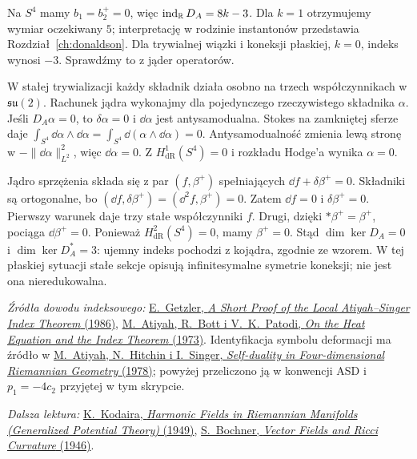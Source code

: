 \begin{przyklad}
\label{prz:hodge-asd-sfera-18}
Na $S^4$ mamy $b_1=b_2^+=0$, więc
$\operatorname{ind}_{\mathbb{R}} D_A=8k-3$.
Dla $k=1$ otrzymujemy wymiar oczekiwany $5$;
interpretację w rodzinie instantonów przedstawia
Rozdział~\ref{ch:donaldson}.
Dla trywialnej wiązki i koneksji płaskiej, $k=0$,
indeks wynosi $-3$. Sprawdźmy to z jąder operatorów.

W stałej trywializacji każdy składnik działa osobno na
trzech współczynnikach w $\mathfrak{su}(2)$.
Rachunek jądra wykonajmy dla pojedynczego rzeczywistego
składnika $\alpha$.
Jeśli $D_A\alpha=0$, to $\delta\alpha=0$ i
$\dd\alpha$ jest antysamodualna.
Stokes na zamkniętej sferze daje
$\int_{S^4}\dd\alpha\wedge\dd\alpha
=\int_{S^4}\dd(\alpha\wedge\dd\alpha)=0$.
Antysamodualność zmienia lewą stronę w
$-\|\dd\alpha\|_{L^2}^2$, więc $\dd\alpha=0$.
Z $H^1_{\mathrm{dR}}(S^4)=0$ i rozkładu Hodge'a wynika $\alpha=0$.

Jądro sprzężenia składa się z par $(f,\beta^+)$
spełniających $\dd f+\delta\beta^+=0$.
Składniki są ortogonalne, bo
$(\dd f,\delta\beta^+)=(\dd^2f,\beta^+)=0$.
Zatem $\dd f=0$ i $\delta\beta^+=0$.
Pierwszy warunek daje trzy stałe współczynniki $f$.
Drugi, dzięki $*\beta^+=\beta^+$, pociąga $\dd\beta^+=0$.
Ponieważ $H^2_{\mathrm{dR}}(S^4)=0$, mamy $\beta^+=0$.
Stąd $\dim\ker D_A=0$ i $\dim\ker D_A^*=3$:
ujemny indeks pochodzi z kojądra, zgodnie ze wzorem.
W tej płaskiej sytuacji stałe sekcje opisują
infinitesymalne symetrie koneksji; nie jest ona nieredukowalna.
\end{przyklad}

\par\smallskip
{\footnotesize\noindent\emph{Źródła dowodu indeksowego:}
\href{https://www.maths.ed.ac.uk/~v1ranick/papers/getzler.pdf}
{E.~Getzler, \emph{A Short Proof of the Local
Atiyah--Singer Index Theorem} (1986)},
\href{https://doi.org/10.1007/BF01425417}
{M.~Atiyah, R.~Bott i V.~K.~Patodi,
\emph{On the Heat Equation and the Index Theorem} (1973)}.
Identyfikacja symbolu deformacji ma źródło w
\href{https://doi.org/10.1098/rspa.1978.0143}
{M.~Atiyah, N.~Hitchin i I.~Singer,
\emph{Self-duality in Four-dimensional Riemannian
Geometry} (1978)}; powyżej przeliczono ją
w konwencji ASD i \(p_1=-4c_2\)
przyjętej w tym skrypcie.\par}

\par\smallskip
{\footnotesize\noindent\emph{Dalsza lektura:}
\href{https://doi.org/10.2307/1969552}
{K.\ Kodaira, \emph{Harmonic Fields in Riemannian Manifolds
(Generalized Potential Theory)} (1949)},
\href{https://doi.org/10.1090/S0002-9904-1946-08647-4}
{S.\ Bochner, \emph{Vector Fields and Ricci Curvature} (1946)}.\par}
